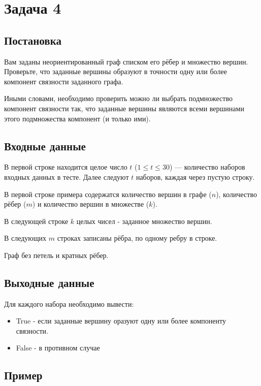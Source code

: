 \documentclass{extarticle}
\begin{document}
\pagebreak
\section*{Задача 4}
\label{sec:org22fdf41}
\subsection*{Постановка}
\label{sec:org9fba3ec}

Вам заданы неориентированный граф списком его рёбер и множество вершин. Проверьте, что заданные вершины образуют в точности одну или более компонент связности заданного графа.

Иными словами, необходимо проверить можно ли выбрать подмножество компонент связности так, что заданные вершины являются всеми вершинами этого подмножества компонент (и только ими).

\subsection*{Входные данные}
\label{sec:org4e03d7e}

В первой строке находится целое число \(t\)
(\(1 \leq t \leq 30\)) — количество наборов
входных данных в тесте.
Далее следуют \(t\) наборов, каждая через пустую строку.

В первой строке примера содержатся количество вершин в графе (\(n\)),
количество рёбер (\(m\)) и количество вершин в множестве (\(k\)).

В следующей строке \(k\) целых чисел - заданное множество вершин.

В следующих \(m\) строках записаны рёбра, по одному ребру в строке.

Граф без петель и кратных рёбер.

\subsection*{Выходные данные}
\label{sec:org59cd729}

Для каждого набора необходимо вывести:
\begin{itemize}
\item True - если заданные вершину оразуют одну или более компоненту связности.
\item False - в противном случае
\end{itemize}

\subsection*{Пример}
\label{sec:org9c889df}
\end{document}

